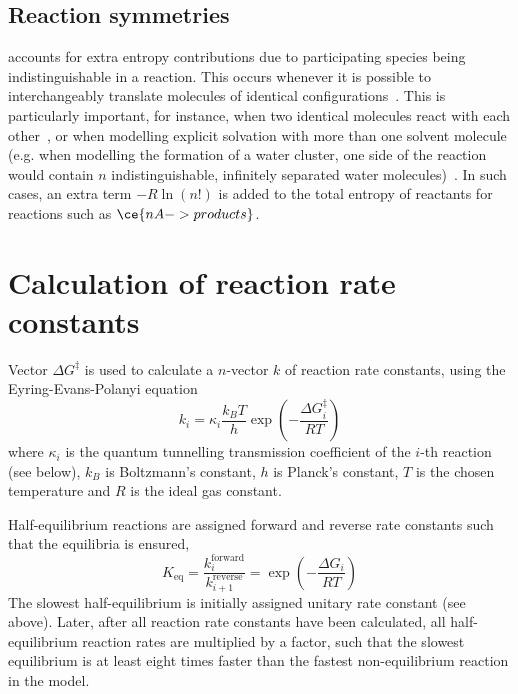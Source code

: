 \subsection{Reaction symmetries}

\overreact accounts for extra entropy contributions due to participating species being indistinguishable in a reaction.
This occurs whenever it is possible to interchangeably translate molecules of identical configurations~\cite{Fern_ndez_Ramos_2007,Gilson_2010}.
This is particularly important,
for instance,
when two identical molecules react with each other~\cite{Fern_ndez_Ramos_2007,Gilson_2010},
or when modelling explicit solvation with more than one solvent molecule (e.g.
when modelling the formation of a water cluster,
one side of the reaction would contain $n$ indistinguishable,
infinitely separated water molecules)~\cite{Jensen_2015}.
In such cases,
an extra term $-R \ln{\left( n! \right)}$ is added to the total entropy of reactants for reactions such as $\ce{n A -> products}$.

\section{Calculation of reaction rate constants}%
\label{sec:rates}

Vector $\Delta G^\ddagger$ is used to calculate a $n$-vector $k$ of reaction rate constants,
using the Eyring-Evans-Polanyi equation~\cite{Eyring_1935,Evans_1935}
% 
\begin{equation}\label{eq:rate-consts}
	k_i = \kappa_i \frac{k_B T}{h}
	\exp \left(-\frac{\Delta G_i^\ddagger}{R T} \right)
\end{equation}
% 
where $\kappa_i$ is the quantum tunnelling transmission coefficient of the $i$-th reaction (see below),
$k_B$ is Boltzmann's constant,
$h$ is Planck's constant,
$T$ is the chosen temperature and $R$ is the ideal gas constant.

Half-equilibrium reactions are assigned forward and reverse rate constants such that the equilibria is ensured,
% 
\begin{equation}
	K_\text{eq}
	= \frac{k_i^\text{forward}}{k_{i + 1}^\text{reverse}}
	= \exp \left(-\frac{\Delta G_i}{R T} \right)
\end{equation}
% 
The slowest half-equilibrium is initially assigned unitary rate constant (see above).
Later,
after all reaction rate constants have been calculated,
all half-equilibrium reaction rates are multiplied by a factor,
such that the slowest equilibrium is at least eight times faster than the fastest non-equilibrium reaction in the model.

